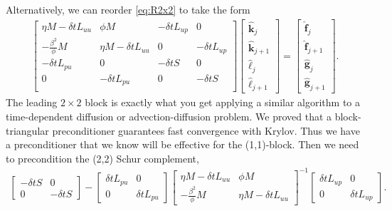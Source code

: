 \documentclass[a4paper,10pt]{article}
\begin{document}
Alternatively, we can reorder \eqref{eq:R2x2} to take the form
%
\begin{align}\label{eq:R2x2_2}
\begin{bmatrix}
	\eta M - \delta tL_{uu} & \phi M & -\delta tL_{up} & 0 \\
	-\frac{\beta^2}{\phi}M & \eta M - \delta tL_{uu} & 0 & -\delta tL_{up} \\
	-\delta tL_{pu} & 0 & -\delta tS & 0 \\
	0 & -\delta tL_{pu} & 0 & -\delta tS \\
	\end{bmatrix}
	\begin{bmatrix} \hat{\mathbf{k}}_j \\ \hat{\mathbf{k}}_{j+1} \\ 
		\hat{\ell}_j \\\hat{\ell}_{j+1} \end{bmatrix} =
	\begin{bmatrix} \hat{\mathbf{f}}_j \\ \hat{\mathbf{f}}_{j+1} \\
		 \hat{\mathbf{g}}_j \\ \hat{\mathbf{g}}_{j+1} \end{bmatrix}.
\end{align}
%
The leading $2\times 2$ block is exactly what you get applying a similar
algorithm to a time-dependent diffusion or advection-diffusion problem.
We proved that a block-triangular preconditioner guarantees fast convergence
with Krylov. Thus we have a preconditioner that we know will be effective
for the (1,1)-block. Then we need to precondition the (2,2) Schur complement,
%
\begin{align}\label{eq:blockS}
\begin{bmatrix} -\delta tS & 0 \\ 0 & -\delta tS\end{bmatrix} 
	- \begin{bmatrix} \delta tL_{pu} & 0 \\ 0 & \delta tL_{pu}\end{bmatrix}
	\begin{bmatrix} \eta M - \delta tL_{uu} & \phi M \\
		-\frac{\beta^2}{\phi}M & \eta M - \delta tL_{uu} \end{bmatrix}^{-1}
	\begin{bmatrix} \delta tL_{up} & 0 \\ 0 & \delta tL_{up} \end{bmatrix}.
\end{align}
\end{document}
